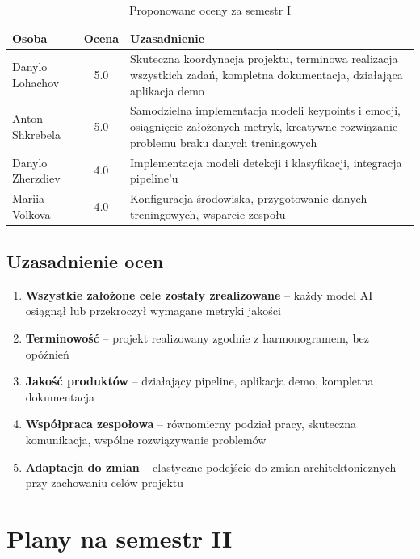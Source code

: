 \documentclass[12pt,a4paper]{article}
\begin{document}
\begin{table}[h]
\centering
\begin{tabular}{lcp{8cm}}
\toprule
\textbf{Osoba} & \textbf{Ocena} & \textbf{Uzasadnienie} \\
\midrule
Danylo Lohachov & 5.0 & Skuteczna koordynacja projektu, terminowa realizacja wszystkich zadań, kompletna dokumentacja, działająca aplikacja demo \\
\addlinespace
Anton Shkrebela & 5.0 & Samodzielna implementacja modeli keypoints i emocji, osiągnięcie założonych metryk, kreatywne rozwiązanie problemu braku danych treningowych \\
\addlinespace
Danylo Zherzdiev & 4.0 & Implementacja modeli detekcji i klasyfikacji, integracja pipeline'u \\
\addlinespace
Mariia Volkova & 4.0 & Konfiguracja środowiska, przygotowanie danych treningowych, wsparcie zespołu \\
\bottomrule
\end{tabular}
\caption{Proponowane oceny za semestr I}
\end{table}

\subsection{Uzasadnienie ocen}

\begin{enumerate}
    \item \textbf{Wszystkie założone cele zostały zrealizowane} -- każdy model AI osiągnął lub przekroczył wymagane metryki jakości
    \item \textbf{Terminowość} -- projekt realizowany zgodnie z harmonogramem, bez opóźnień
    \item \textbf{Jakość produktów} -- działający pipeline, aplikacja demo, kompletna dokumentacja
    \item \textbf{Współpraca zespołowa} -- równomierny podział pracy, skuteczna komunikacja, wspólne rozwiązywanie problemów
    \item \textbf{Adaptacja do zmian} -- elastyczne podejście do zmian architektonicznych przy zachowaniu celów projektu
\end{enumerate}

\section{Plany na semestr II}
\end{document}
